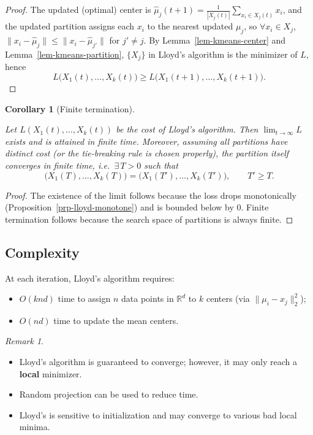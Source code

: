\documentclass[
  letterpaper,
  DIV=11,
  numbers=noendperiod]{scrreprt}
\providecommand{\tightlist}{%
  \setlength{\itemsep}{0pt}\setlength{\parskip}{0pt}}
\theoremstyle{definition}
\theoremstyle{plain}
\theoremstyle{plain}
\theoremstyle{definition}
\theoremstyle{plain}
\newtheorem{corollary}{Corollary}[chapter]
\theoremstyle{plain}
\theoremstyle{remark}
\newtheorem*{remark}{Remark}
\begin{document}
\begin{proof}
The updated (optimal) center is
\(\hat{\mu}_j(t+1) = \frac{1}{|X_j(t)|} \sum_{x_i \in X_j(t)} x_i\), and
the updated partition assigns each \(x_i\) to the nearest updated
\(\mu_j\), so \(\forall x_i \in X_j\),
\(\|x_i - \hat{\mu}_j\| \le \|x_i - \hat{\mu}_{j'}\|\) for \(j' \ne j\).
By Lemma~\ref{lem-kmeans-center} and Lemma~\ref{lem-kmeans-partition},
\(\{X_j\}\) in Lloyd's algorithm is the minimizer of \(L\), hence \[
L\big(X_1(t), \dots, X_k(t)\big) \ge L\big(X_1(t+1), \dots, X_k(t+1)\big).
\]
\end{proof}

\begin{corollary}[Finite
termination]\protect\hypertarget{cor-lloyd-terminate}{}\label{cor-lloyd-terminate}

Let \(L(X_1(t), \dots, X_k(t))\) be the cost of Lloyd's algorithm. Then
\(\lim_{t \to \infty} L\) exists and is attained in finite time.
Moreover, assuming all partitions have distinct cost (or the
tie-breaking rule is chosen properly), the partition itself converges in
finite time, i.e.~\(\exists\, T > 0\) such that \[
\big(X_1(T), \dots, X_k(T)\big) = \big(X_1(T'), \dots, X_k(T')\big), \qquad T' \ge T.
\]

\end{corollary}

\begin{proof}
The existence of the limit follows because the loss drops monotonically
(Proposition~\ref{prp-lloyd-monotone}) and is bounded below by \(0\).
Finite termination follows because the search space of partitions is
always finite.
\end{proof}

\subsection{Complexity}\label{complexity}

At each iteration, Lloyd's algorithm requires:

\begin{itemize}
\tightlist
\item
  \(O(knd)\) time to assign \(n\) data points in \(\mathbb{R}^d\) to
  \(k\) centers (via \(\|\mu_i - x_j\|_2^2\));
\item
  \(O(nd)\) time to update the mean centers.
\end{itemize}

\begin{remark}
\leavevmode

\begin{itemize}
\tightlist
\item
  Lloyd's algorithm is guaranteed to converge; however, it may only
  reach a \textbf{local} minimizer.
\item
  Random projection can be used to reduce time.
\item
  Lloyd's is sensitive to initialization and may converge to various bad
  local minima.
\end{itemize}

\end{remark}
\end{document}
